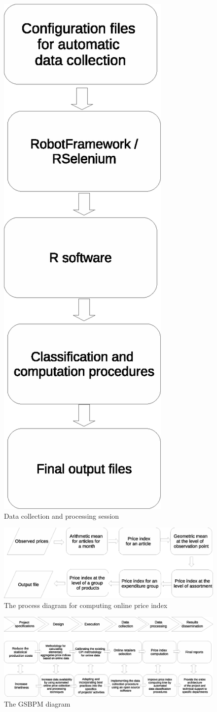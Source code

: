 \documentclass[]{article}
\begin{document}
\begin{figure}
	\centering
	\includegraphics[height=1\linewidth]{fig6.eps}
	\caption{Data collection and processing session}
	\label{fig:1}
\end{figure}

\clearpage

\begin{figure}
	\centering
	\includegraphics[width=1\linewidth]{fig1.eps}
	\caption{The process diagram for computing online price index}
	\label{fig:2}
\end{figure}

\clearpage

\begin{figure}
	\centering
	\includegraphics[width=1\linewidth]{fig2.eps}
	\caption{The GSBPM diagram}
	\label{fig:3}
\end{figure}
\end{document}
